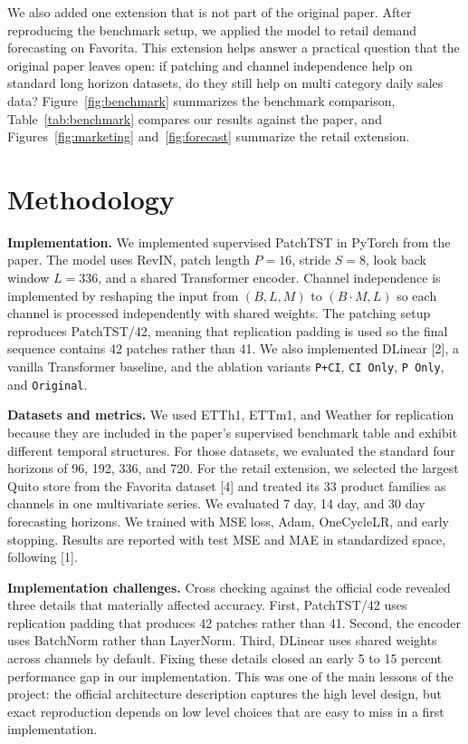 \documentclass[11pt]{article}
\begin{document}
We also added one extension that is not part of the original paper. After reproducing the benchmark setup, we applied the model to retail demand forecasting on Favorita. This extension helps answer a practical question that the original paper leaves open: if patching and channel independence help on standard long horizon datasets, do they still help on multi category daily sales data? Figure~\ref{fig:benchmark} summarizes the benchmark comparison, Table~\ref{tab:benchmark} compares our results against the paper, and Figures~\ref{fig:marketing} and~\ref{fig:forecast} summarize the retail extension.

\section{Methodology}

\textbf{Implementation.} We implemented supervised PatchTST in PyTorch from the paper. The model uses RevIN, patch length $P=16$, stride $S=8$, look back window $L=336$, and a shared Transformer encoder. Channel independence is implemented by reshaping the input from $(B,L,M)$ to $(B \cdot M,L)$ so each channel is processed independently with shared weights. The patching setup reproduces PatchTST/42, meaning that replication padding is used so the final sequence contains 42 patches rather than 41. We also implemented DLinear [2], a vanilla Transformer baseline, and the ablation variants \texttt{P+CI}, \texttt{CI Only}, \texttt{P Only}, and \texttt{Original}.

\textbf{Datasets and metrics.} We used ETTh1, ETTm1, and Weather for replication because they are included in the paper's supervised benchmark table and exhibit different temporal structures. For those datasets, we evaluated the standard four horizons of 96, 192, 336, and 720. For the retail extension, we selected the largest Quito store from the Favorita dataset [4] and treated its 33 product families as channels in one multivariate series. We evaluated 7 day, 14 day, and 30 day forecasting horizons. We trained with MSE loss, Adam, OneCycleLR, and early stopping. Results are reported with test MSE and MAE in standardized space, following [1].

\textbf{Implementation challenges.} Cross checking against the official code revealed three details that materially affected accuracy. First, PatchTST/42 uses replication padding that produces 42 patches rather than 41. Second, the encoder uses BatchNorm rather than LayerNorm. Third, DLinear uses shared weights across channels by default. Fixing these details closed an early 5 to 15 percent performance gap in our implementation. This was one of the main lessons of the project: the official architecture description captures the high level design, but exact reproduction depends on low level choices that are easy to miss in a first implementation.
\end{document}
